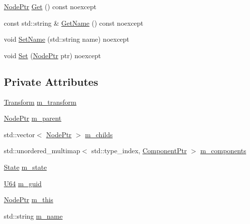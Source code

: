 \begin{DoxyCompactItemize}
\item 
\mbox{\hyperlink{classmage_1_1_node_ac575dc006e0ae1134277ade977dc06b6}{Node\+Ptr}} \mbox{\hyperlink{classmage_1_1_node_ac317011c240a845fbdb7209e26d560f2}{Get}} () const noexcept
\item 
const std\+::string \& \mbox{\hyperlink{classmage_1_1_node_a66c1c1c76861ecb7d26252a9da865f63}{Get\+Name}} () const noexcept
\item 
void \mbox{\hyperlink{classmage_1_1_node_a7fabe953ff8ca39e7e499fc16d551965}{Set\+Name}} (std\+::string name) noexcept
\item 
void \mbox{\hyperlink{classmage_1_1_node_aabbe500cdf7842b663bfcf034de25c5a}{Set}} (\mbox{\hyperlink{classmage_1_1_node_ac575dc006e0ae1134277ade977dc06b6}{Node\+Ptr}} ptr) noexcept
\end{DoxyCompactItemize}
\subsection*{Private Attributes}
\begin{DoxyCompactItemize}
\item 
\mbox{\hyperlink{classmage_1_1_transform}{Transform}} \mbox{\hyperlink{classmage_1_1_node_a0f4dd0c46d9713fd64b0e562862afac6}{m\+\_\+transform}}
\item 
\mbox{\hyperlink{classmage_1_1_node_ac575dc006e0ae1134277ade977dc06b6}{Node\+Ptr}} \mbox{\hyperlink{classmage_1_1_node_aa04f166b52fca444c8756c0864a16cde}{m\+\_\+parent}}
\item 
std\+::vector$<$ \mbox{\hyperlink{classmage_1_1_node_ac575dc006e0ae1134277ade977dc06b6}{Node\+Ptr}} $>$ \mbox{\hyperlink{classmage_1_1_node_a1d1d432f46c61932b5167d27d20cc383}{m\+\_\+childs}}
\item 
std\+::unordered\+\_\+multimap$<$ std\+::type\+\_\+index, \mbox{\hyperlink{classmage_1_1_node_a46b7e1f4f5b98bfa78ed96a80797a4ba}{Component\+Ptr}} $>$ \mbox{\hyperlink{classmage_1_1_node_a804d53398f193b6b06f883131ab7415d}{m\+\_\+components}}
\item 
\mbox{\hyperlink{namespacemage_ae47d13d8477ee94893b9a3947d28eebc}{State}} \mbox{\hyperlink{classmage_1_1_node_a76b775e32bb001c54a9927461eaf7926}{m\+\_\+state}}
\item 
\mbox{\hyperlink{namespacemage_a6672cf3c861707ce4a3235a3eb43941d}{U64}} \mbox{\hyperlink{classmage_1_1_node_a3ef1876293074bfcc01104eb92f1bfdf}{m\+\_\+guid}}
\item 
\mbox{\hyperlink{classmage_1_1_node_ac575dc006e0ae1134277ade977dc06b6}{Node\+Ptr}} \mbox{\hyperlink{classmage_1_1_node_ab056e1563dca22433efa152f4b6da46f}{m\+\_\+this}}
\item 
std\+::string \mbox{\hyperlink{classmage_1_1_node_a69cfc52bdc0572dfc776e2ff27c9eec2}{m\+\_\+name}}
\end{DoxyCompactItemize}


